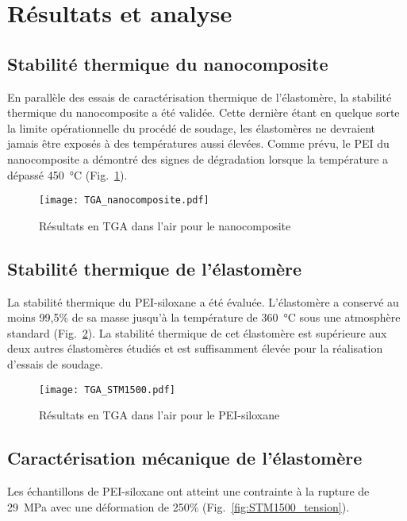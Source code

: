 \FloatBarrier
\section{Résultats et analyse}

\subsection{Stabilité thermique du nanocomposite}

En parallèle des essais de caractérisation thermique de l'élastomère, la stabilité thermique du nanocomposite a été validée. 
Cette dernière étant en quelque sorte la limite opérationnelle du procédé de soudage, les élastomères ne devraient jamais être exposés à des températures aussi élevées. 
Comme prévu, le PEI du nanocomposite a démontré des signes de dégradation lorsque la température a dépassé \SI[locale=FR]{450}{\celsius} (Fig.~\ref{fig:TGA_nanocomposite}). 

\begin{figure}[htb]
	\centering
	\texttt{[image: TGA\_nanocomposite.pdf]}
	\caption{Résultats en TGA dans l'air pour le nanocomposite}
	\label{fig:TGA_nanocomposite}
\end{figure}

\FloatBarrier
\subsection{Stabilité thermique de l'élastomère}

La stabilité thermique du PEI-siloxane a été évaluée. 
L'élastomère a conservé au moins 99,5\% de sa masse jusqu'à la température de \SI[locale=FR]{360}{\celsius} sous une atmosphère standard (Fig.~\ref{fig:TGA_STM1500}). 
La stabilité thermique de cet élastomère est supérieure aux deux autres élastomères étudiés et est suffisamment élevée pour la réalisation d'essais de soudage. 

\begin{figure}[h]
	\centering
	\texttt{[image: TGA\_STM1500.pdf]}
	\caption{Résultats en TGA dans l'air pour le PEI-siloxane}
	\label{fig:TGA_STM1500}
\end{figure}

\FloatBarrier
\subsection{Caractérisation mécanique de l'élastomère}

Les échantillons de PEI-siloxane ont atteint une contrainte à la rupture de \SI[locale=FR]{29}{\mega\pascal} avec une déformation de 250\% (Fig.~\ref{fig:STM1500_tension}). 

